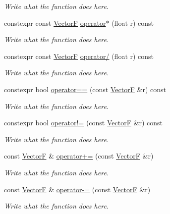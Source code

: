 \begin{DoxyCompactItemize}
\begin{DoxyCompactList}\small\item\em Write what the function does here. \end{DoxyCompactList}\item 
constexpr const \hyperlink{structVectorF}{Vector\+F} \hyperlink{structVectorF_a08f45eb79db6ea2dfdec066e366af752}{operator$\ast$} (float r) const 
\begin{DoxyCompactList}\small\item\em Write what the function does here. \end{DoxyCompactList}\item 
constexpr const \hyperlink{structVectorF}{Vector\+F} \hyperlink{structVectorF_a217a23d0ad4bcbe7d801d5df4399152f}{operator/} (float r) const 
\begin{DoxyCompactList}\small\item\em Write what the function does here. \end{DoxyCompactList}\item 
constexpr bool \hyperlink{structVectorF_a6ddfb24b4998b965c3f1348d6f15ee6f}{operator==} (const \hyperlink{structVectorF}{Vector\+F} \&r) const 
\begin{DoxyCompactList}\small\item\em Write what the function does here. \end{DoxyCompactList}\item 
constexpr bool \hyperlink{structVectorF_ae46d7475b96acfad53885c5b72621aa9}{operator!=} (const \hyperlink{structVectorF}{Vector\+F} \&r) const 
\begin{DoxyCompactList}\small\item\em Write what the function does here. \end{DoxyCompactList}\item 
const \hyperlink{structVectorF}{Vector\+F} \& \hyperlink{structVectorF_a767e52b421c36f5779d4eda65b965f4a}{operator+=} (const \hyperlink{structVectorF}{Vector\+F} \&r)
\begin{DoxyCompactList}\small\item\em Write what the function does here. \end{DoxyCompactList}\item 
const \hyperlink{structVectorF}{Vector\+F} \& \hyperlink{structVectorF_ad5ebdb98451cbc3d7c884cf3b89b963a}{operator-\/=} (const \hyperlink{structVectorF}{Vector\+F} \&r)
\begin{DoxyCompactList}\small\item\em Write what the function does here. \end{DoxyCompactList}\item 

\end{DoxyCompactItemize}
